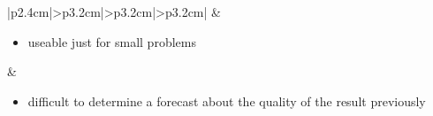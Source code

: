 \begin{table}[H]
\begin{tabular}{|p{2.4cm}|>{\RaggedRight}p{3.2cm}|>{\RaggedRight}p{3.2cm}|>{\RaggedRight}p{3.2cm}|}
		& \begin{minipage}[t]{\linewidth}
			\begin{itemize}[nolistsep, noitemsep,after=\strut,leftmargin=10pt,
				before*={\mbox{}\vspace{-\baselineskip}}]
				\item useable just for small problems
			\end{itemize}
		\end{minipage} 
		
		& \begin{minipage}[t]{\linewidth}
			\begin{itemize}[nolistsep, noitemsep,after=\strut,leftmargin=10pt,
				before*={\mbox{}\vspace{-\baselineskip}}]
				\item difficult to determine a forecast about the quality of the result previously
			\end{itemize}
		\end{minipage} 
 \tabularnewline
				\hline
	\end{tabular}
	\caption{Comparison of different types of models applied for solving area segmentation problems}
\end{table}
 
